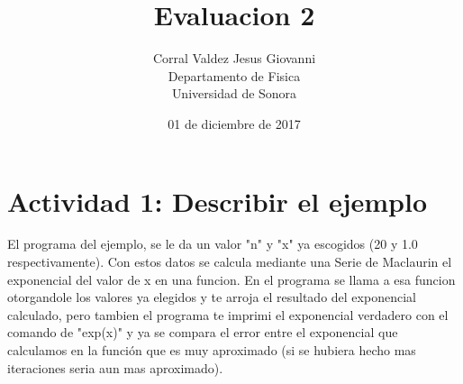 \documentclass{article}
\title{Evaluacion 2}
\author{Corral Valdez Jesus Giovanni\\
Departamento de Fisica \\
Universidad de Sonora}
\date{01 de diciembre de 2017}
\begin{document}
\maketitle
\clearpage

\section{Actividad 1: Describir el ejemplo}
El programa del ejemplo, se le da un valor "n" y "x" ya escogidos (20 y 1.0 respectivamente). Con estos datos se calcula mediante una Serie de Maclaurin el exponencial del valor de x en una funcion. En el programa se llama a esa funcion otorgandole los valores ya elegidos y te arroja el resultado del exponencial calculado, pero tambien el programa te imprimi el exponencial verdadero con el comando de "exp(x)" y ya se compara el error entre el exponencial que calculamos en la función que es muy aproximado (si se hubiera hecho mas iteraciones seria aun mas aproximado).

\clearpage
\end{document}
